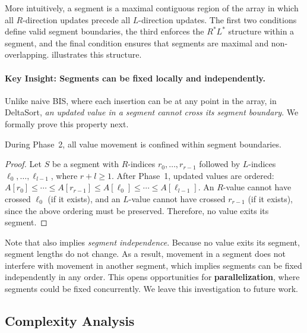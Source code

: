 

More intuitively, a segment is a maximal contiguous region of the array in which all $R$-direction updates precede all $L$-direction updates. The first two conditions define valid segment boundaries, the third enforces the $R^\ast L^\ast$ structure within a segment, and the final condition ensures that segments are maximal and non-overlapping.  illustrates this structure.

\paragraph{Key Insight: Segments can be fixed locally and independently.}

Unlike naive BIS, where each insertion can be at any point in the array, in DeltaSort, \emph{an updated value in a segment cannot cross its segment boundary}. We formally prove this property next.

\begin{lemma}
\label{lem:confinement}
During Phase~2, all value movement is confined within segment boundaries.
\end{lemma}

\begin{proof}
Let $S$ be a segment with $R$-indices $r_0,\ldots,r_{r-1}$ followed by $L$-indices $\ell_0,\ldots,\ell_{l-1}$, where $r+l \ge 1$. After Phase~1, updated values are ordered: $A[r_0] \le \cdots \le A[r_{r-1}] \le A[\ell_0] \le \cdots \le A[\ell_{l-1}]$. An $R$-value cannot have crossed $\ell_0$ (if it exists), and an $L$-value cannot have crossed $r_{r-1}$ (if it exists), since the above ordering must be preserved. Therefore, no value exits its segment.
\end{proof}

\begin{remark}
  Note that  also implies \emph{segment independence}. Because no value exits its segment, segment lengths do not change. As a result, movement in a segment does not interfere with movement in another segment, which implies segments can be fixed independently in any order. This opens opportunities for \textbf{parallelization}, where segments could be fixed concurrently. We leave this investigation to future work.
\end{remark}

\subsection{Complexity Analysis}
\label{sec:complexity}

